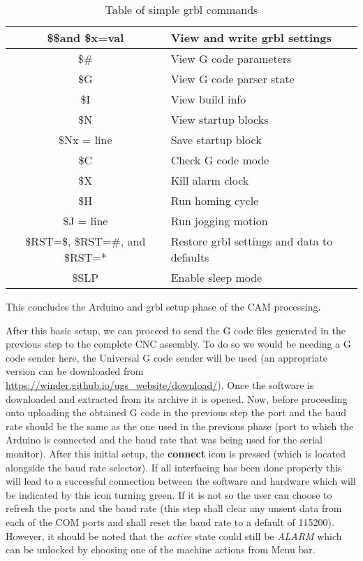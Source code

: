 \begin{table}[h]
    \begin{center}
    \caption{Table of simple grbl commands}
    \begin{tabular}{|c|l|}
        \hline
		\$\$and \$x=val & View and write grbl settings  \\
		\hline
		\$\# & View G code parameters \\
		\hline
		\$G & View G code parser state \\ 
		\hline 
		\$I & View build info  \\
		\hline
		\$N &	View startup blocks \\
		\hline
		\$Nx = line & Save startup block \\
		\hline
		\$C & Check G code mode \\
		\hline
		\$X & Kill alarm clock \\
		\hline
		\$H & Run homing cycle\\
		\hline
		\$J = line & Run jogging motion\\
		\hline
		\$RST=\$, \$RST=\#, and \$RST=* & Restore grbl settings and data to defaults\\
		\hline
		\$SLP & Enable sleep mode \\
		\hline
    \end{tabular}    
    \end{center}
    \label{tab:grbl_cmds}
\end{table}


This concludes the Arduino and grbl setup phase of the CAM processing.

After this basic setup, we can proceed to send the G code files generated in the previous step to the complete CNC assembly. To do so we would be needing a G code sender here, the Universal G code sender will be used (an appropriate version can be downloaded from \url{https://winder.github.io/ugs_website/download/}). Once the software is downloaded and extracted from its archive it is opened. Now, before proceeding onto uploading the obtained G code in the previous step the port and the baud rate should be the same as the one used in the previous phase (port to which the Arduino is connected and the baud rate that was being used for the serial monitor). After this initial setup, the \textbf{connect} icon is pressed (which is located alongside the baud rate selector). If all interfacing has been done properly this will lead to a successful connection between the software and hardware which will be indicated by this icon turning green. If it is not so the user can choose to refresh the ports and the baud rate (this step shall clear any unsent data from each of the COM ports and shall reset the baud rate to a default of 115200). However, it should be noted that the \textit{active} state could still be \textit{ALARM} which can be unlocked by choosing one of the machine actions from Menu bar.

